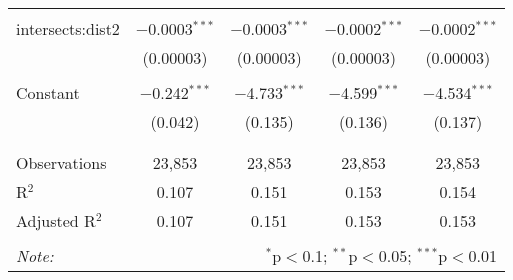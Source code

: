 \begin{table}[!htbp]
\begin{tabular}{@{\extracolsep{-5pt}}lcccc}
  & & & & \\ 
 intersects:dist2 & $-$0.0003$^{***}$ & $-$0.0003$^{***}$ & $-$0.0002$^{***}$ & $-$0.0002$^{***}$ \\ 
  & (0.00003) & (0.00003) & (0.00003) & (0.00003) \\ 
  & & & & \\ 
 Constant & $-$0.242$^{***}$ & $-$4.733$^{***}$ & $-$4.599$^{***}$ & $-$4.534$^{***}$ \\ 
  & (0.042) & (0.135) & (0.136) & (0.137) \\ 
  & & & & \\ 
\hline \\[-1.8ex] 
Observations & 23,853 & 23,853 & 23,853 & 23,853 \\ 
R$^{2}$ & 0.107 & 0.151 & 0.153 & 0.154 \\ 
Adjusted R$^{2}$ & 0.107 & 0.151 & 0.153 & 0.153 \\ 
\hline 
\hline \\[-1.8ex] 
\textit{Note:}  & \multicolumn{4}{r}{$^{*}$p$<$0.1; $^{**}$p$<$0.05; $^{***}$p$<$0.01} \\ 
\end{tabular} 
\end{table} 
